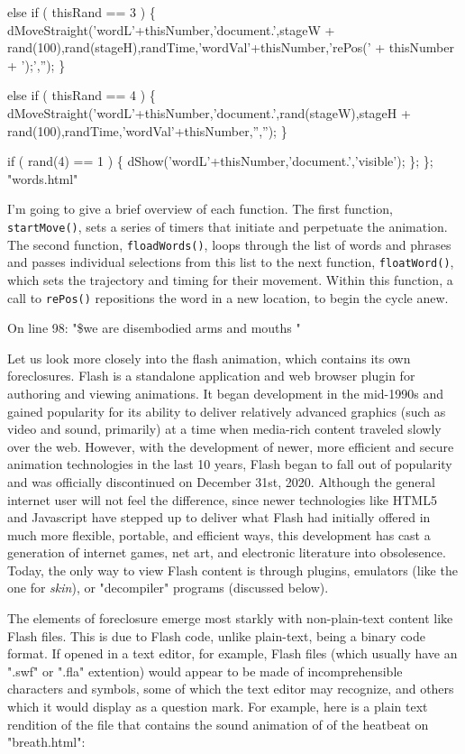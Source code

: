 \documentclass[11pt]{article}
\begin{document}
\begin{enumerate}
\begin{SOURCE}
else if ( thisRand == 3 ) \{
dMoveStraight('wordL'+thisNumber,'document.',stageW + rand(100),rand(stageH),randTime,'wordVal'+thisNumber,'rePos(' + thisNumber + ');',''); \}

else if ( thisRand == 4 ) \{
dMoveStraight('wordL'+thisNumber,'document.',rand(stageW),stageH + rand(100),randTime,'wordVal'+thisNumber,'',''); \}

if ( rand(4) == 1 ) \{ dShow('wordL'+thisNumber,'document.','visible'); \};
\}; "words.html"
\end{SOURCE}
I'm going to give a brief overview of each function. The first
function, \texttt{startMove()}, sets a series of timers that initiate and
perpetuate the animation. The second function, \texttt{floadWords()}, loops
through the list of words and phrases and passes individual selections
from this list to the next function, \texttt{floatWord()}, which sets the
trajectory and timing for their movement. Within this function, a call
to \texttt{rePos()} repositions the word in a new location, to begin the
cycle anew. 

On line 98: "\$we are disembodied arms and mouths "

Let us look more closely into the flash animation, which contains its
own foreclosures. Flash is a standalone application and web browser
plugin for authoring and viewing animations. It began development in
the mid-1990s and gained popularity for its ability to deliver
relatively advanced graphics (such as video and sound, primarily) at a
time when media-rich content traveled slowly over the web. However,
with the development of newer, more efficient and secure animation
technologies in the last 10 years, Flash began to fall out of
popularity and was officially discontinued on December
31st, 2020. Although the general internet user will not feel the
difference, since newer technologies like HTML5 and Javascript have
stepped up to deliver what Flash had initially offered in much more
flexible, portable, and efficient ways, this development has cast a
generation of internet games, net art, and electronic literature into
obsolesence. Today, the only way to view Flash content is through
plugins, emulators (like the one for \emph{skin}), or "decompiler" programs
(discussed below).

The elements of foreclosure emerge most starkly with non-plain-text
content like Flash files. This is due to Flash code, unlike
plain-text, being a binary code format. If opened in a text editor,
for example, Flash files (which usually have an ".swf" or ".fla"
extention) would appear to be made of incomprehensible characters and
symbols, some of which the text editor may recognize, and others which
it would display as a question mark. For example, here is a plain text
rendition of the file that contains the sound animation of of the
heatbeat on "breath.html":


\end{enumerate}
\end{document}
